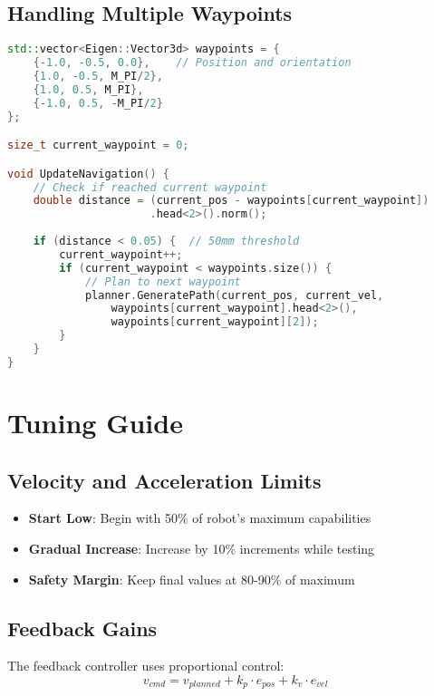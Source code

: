\documentclass[12pt,a4paper]{article}
\begin{document}
\subsection{Handling Multiple Waypoints}
\begin{lstlisting}[language=C++, caption=Multi-waypoint navigation]
std::vector<Eigen::Vector3d> waypoints = {
    {-1.0, -0.5, 0.0},    // Position and orientation
    {1.0, -0.5, M_PI/2},
    {1.0, 0.5, M_PI},
    {-1.0, 0.5, -M_PI/2}
};

size_t current_waypoint = 0;

void UpdateNavigation() {
    // Check if reached current waypoint
    double distance = (current_pos - waypoints[current_waypoint])
                      .head<2>().norm();
    
    if (distance < 0.05) {  // 50mm threshold
        current_waypoint++;
        if (current_waypoint < waypoints.size()) {
            // Plan to next waypoint
            planner.GeneratePath(current_pos, current_vel,
                waypoints[current_waypoint].head<2>(),
                waypoints[current_waypoint][2]);
        }
    }
}
\end{lstlisting}

\section{Tuning Guide}

\subsection{Velocity and Acceleration Limits}
\begin{itemize}
    \item \textbf{Start Low}: Begin with 50\% of robot's maximum capabilities
    \item \textbf{Gradual Increase}: Increase by 10\% increments while testing
    \item \textbf{Safety Margin}: Keep final values at 80-90\% of maximum
\end{itemize}

\subsection{Feedback Gains}
The feedback controller uses proportional control:
\begin{equation}
v_{cmd} = v_{planned} + k_p \cdot e_{pos} + k_v \cdot e_{vel}
\end{equation}
\end{document}
